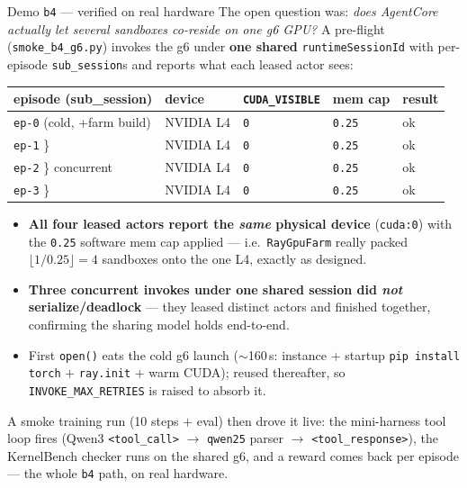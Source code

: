 \documentclass[aspectratio=169]{beamer}
\begin{document}
\begin{frame}{Demo \texttt{b4} --- verified on real hardware}
  \footnotesize The open question was: \emph{does AgentCore actually let several sandboxes co-reside on
  one g6 GPU?} A pre-flight (\texttt{smoke\_b4\_g6.py}) invokes the g6 under \textbf{one shared}
  \texttt{runtimeSessionId} with per-episode \texttt{sub\_session}s and reports what each leased actor sees:
  \vspace{-0.2em}
  \begin{center}\scriptsize
  \begin{tabular}{@{}lllll@{}}
    \toprule
    \textbf{episode (sub\_session)} & \textbf{device} & \texttt{CUDA\_VISIBLE} & \textbf{mem cap} & \textbf{result} \\
    \midrule
    \texttt{ep-0} (cold, +farm build) & NVIDIA L4 & \texttt{0} & \texttt{0.25} & ok \\
    \texttt{ep-1} \} & NVIDIA L4 & \texttt{0} & \texttt{0.25} & ok \\
    \texttt{ep-2} \} concurrent & NVIDIA L4 & \texttt{0} & \texttt{0.25} & ok \\
    \texttt{ep-3} \} & NVIDIA L4 & \texttt{0} & \texttt{0.25} & ok \\
    \bottomrule
  \end{tabular}
  \end{center}
  \vspace{-0.1em}
  \begin{itemize}\setlength\itemsep{0.1em}
    \item \textbf{All four leased actors report the \emph{same} physical device} (\texttt{cuda:0}) with
      the \texttt{0.25} software mem cap applied --- i.e.\ \texttt{RayGpuFarm} really packed
      $\lfloor 1/0.25\rfloor=4$ sandboxes onto the one L4, exactly as designed.
    \item \textbf{Three concurrent invokes under one shared session did \emph{not} serialize/deadlock} ---
      they leased distinct actors and finished together, confirming the sharing model holds end-to-end.
    \item First \texttt{open()} eats the cold g6 launch ($\sim$160\,s: instance $+$ startup \texttt{pip
      install torch} $+$ \texttt{ray.init} $+$ warm CUDA); reused thereafter, so \texttt{INVOKE\_MAX\_RETRIES}
      is raised to absorb it.
  \end{itemize}
  {\scriptsize A smoke training run (10 steps $+$ eval) then drove it live: the mini-harness tool loop fires
  (Qwen3 \texttt{<tool\_call>} $\to$ \texttt{qwen25} parser $\to$ \texttt{<tool\_response>}), the KernelBench
  checker runs on the shared g6, and a reward comes back per episode --- the whole \texttt{b4} path, on real
  hardware.}
\end{frame}
\end{document}

